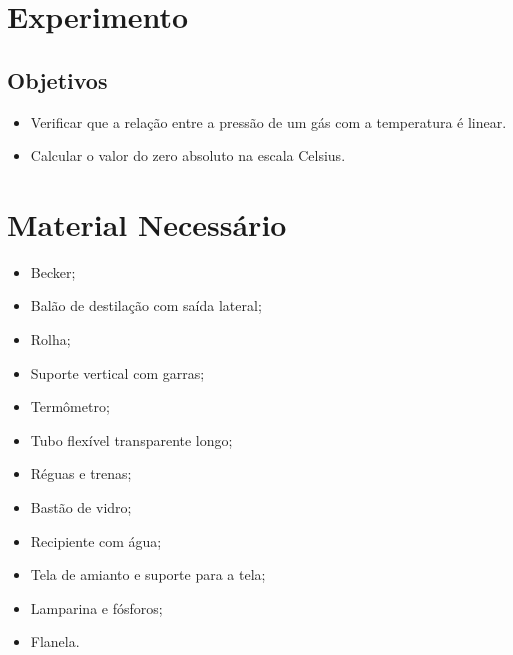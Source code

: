 \section{Experimento}

\subsection{Objetivos}
\label{Sec:ObjetivosZeroAbsoluto}

\begin{itemize}
	\item Verificar que a relação entre a pressão de um gás com a temperatura é linear.
	\item Calcular o valor do zero absoluto na escala Celsius.
\end{itemize}

\section{Material Necessário}

\begin{multicols}{2}
\begin{itemize}
	\item Becker;
	\item Balão de destilação com saída lateral;
	\item Rolha;
	\item Suporte vertical com garras;
	\item Termômetro;
	\item Tubo flexível transparente longo;
	\item Réguas e trenas;
	\item Bastão de vidro;
	\item Recipiente com água;
	\item Tela de amianto e suporte para a tela;
	\item Lamparina e fósforos;
	\item Flanela.
\end{itemize}
\end{multicols}

